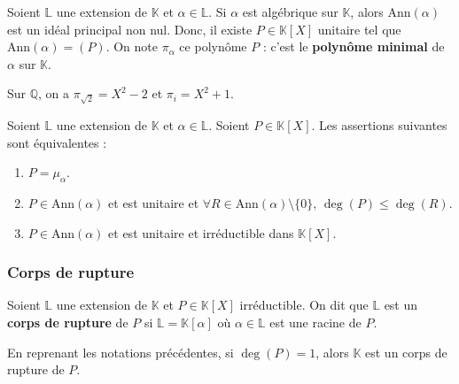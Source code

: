   \begin{definition}
    Soient $\mathbb{L}$ une extension de $\mathbb{K}$ et $\alpha \in \mathbb{L}$. Si $\alpha$ est algébrique sur $\mathbb{K}$, alors $\mathrm{Ann}(\alpha)$ est un idéal principal non nul. Donc, il existe $P \in \mathbb{K}[X]$ unitaire tel que $\mathrm{Ann}(\alpha) = (P)$. On note $\pi_\alpha$ ce polynôme $P$ : c'est le \textbf{polynôme minimal} de $\alpha$ sur $\mathbb{K}$.
  \end{definition}

  \begin{example}
    Sur $\mathbb{Q}$, on a $\pi_{\sqrt{2}} = X^2 - 2$ et $\pi_i = X^2 + 1$.
  \end{example}


  \begin{proposition}
    Soient $\mathbb{L}$ une extension de $\mathbb{K}$ et $\alpha \in \mathbb{L}$. Soient $P \in \mathbb{K}[X]$. Les assertions suivantes sont équivalentes :
    \begin{enumerate}[label=(\roman*)]
      \item $P = \mu_\alpha$.
      \item $P \in \mathrm{Ann}(\alpha)$ et est unitaire et $\forall R \in \mathrm{Ann}(\alpha) \setminus \{ 0 \}, \, \deg(P) \leq \deg(R)$.
      \item $P \in \mathrm{Ann}(\alpha)$ et est unitaire et irréductible dans $\mathbb{K}[X]$.
    \end{enumerate}
  \end{proposition}

  \subsubsection{Corps de rupture}


  \begin{definition}
    Soient $\mathbb{L}$ une extension de $\mathbb{K}$ et $P \in \mathbb{K}[X]$ irréductible. On dit que $\mathbb{L}$ est un \textbf{corps de rupture} de $P$ si $\mathbb{L} = \mathbb{K}[\alpha]$ où $\alpha \in \mathbb{L}$ est une racine de $P$.
  \end{definition}

  \begin{example}
    En reprenant les notations précédentes, si $\deg(P) = 1$, alors $\mathbb{K}$ est un corps de rupture de $P$.
  \end{example}

